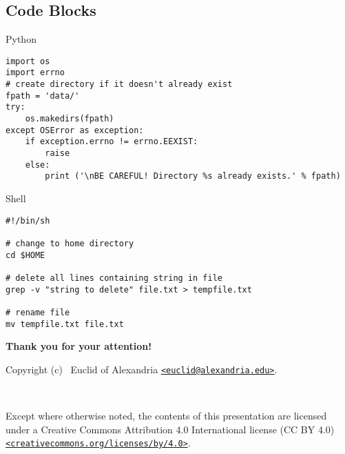 \documentclass[aspectratio=169,xcolor={svgnames}]{beamer}
\begin{document}
\subsection{Code Blocks}
\begin{frame}{\insertsubsectionhead}
\begin{exampleblock}{Python}
\begin{lstlisting}[style=py]
import os
import errno
# create directory if it doesn't already exist
fpath = 'data/'
try:
    os.makedirs(fpath)
except OSError as exception:
    if exception.errno != errno.EEXIST:
        raise
    else:
        print ('\nBE CAREFUL! Directory %s already exists.' % fpath)
\end{lstlisting}
\end{exampleblock}

\begin{exampleblock}{Shell}
\begin{lstlisting}[style=sh]
#!/bin/sh

# change to home directory
cd $HOME

# delete all lines containing string in file
grep -v "string to delete" file.txt > tempfile.txt

# rename file
mv tempfile.txt file.txt
\end{lstlisting}
\end{exampleblock}
\end{frame}

\appendix

\begin{frame}
  \textbf{\LARGE Thank you for your attention!}

  \vspace{16pt}
  Copyright (c) \the\year\ Euclid of Alexandria
  \href{mailto:euclid@alexandria.edu}{\texttt{<euclid@alexandria.edu>}}.

  \vspace{8pt}
  {\Huge\faCreativeCommons\ \faCreativeCommonsBy}

  Except where otherwise noted, the contents of this presentation are licensed
  under a Creative Commons Attribution 4.0 International license (CC BY 4.0)
  \href{https://creativecommons.org/licenses/by/4.0/}
  {\texttt{<creativecommons.org/licenses/by/4.0>}}.
\end{frame}
\end{document}
